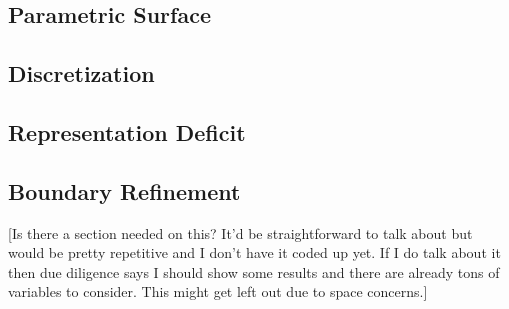 \subsection{Parametric Surface}


\subsection{Discretization}


\subsection{Representation Deficit}


\subsection{Boundary Refinement}
[Is there a section needed on this? It'd be straightforward to talk about
but would be pretty repetitive and I don't have it coded up yet. If I do
talk about it then due diligence says I should show some results and
there are already tons of variables to consider. This might get left out
due to space concerns.]
